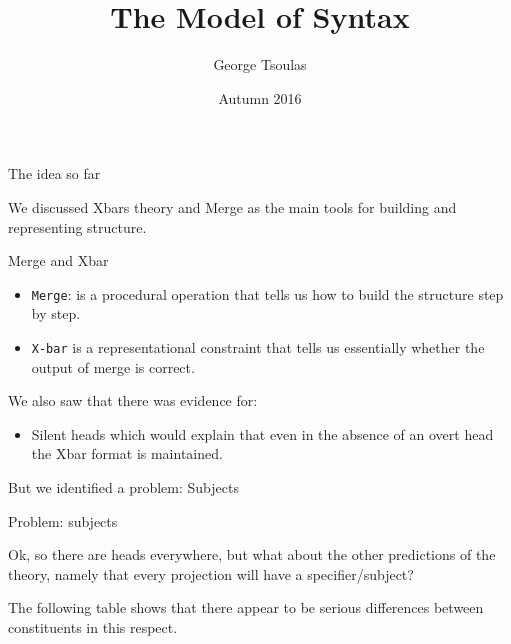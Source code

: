 


\title{The Model of Syntax  }
\date{Autumn 2016}
\author{George Tsoulas}



\maketitle
\begin{frame}
  {The idea so far}

We discussed Xbars theory and Merge as the main tools for building and representing structure.

\end{frame}



\begin{frame}
  {Merge and Xbar}

  \begin{itemize}
\item    \texttt{Merge}:  is a procedural operation that tells us how to build the structure step by step.
  \item \texttt{X-bar} is a representational constraint that tells us essentially whether the output of merge is correct.
  \end{itemize}

\end{frame}


\begin{frame}

  We also saw that there was evidence for:

  \begin{itemize}
  \item Silent heads which would explain that even in the absence of an overt head the Xbar format is maintained.
  \end{itemize}

But we identified a problem:  Subjects

\end{frame}




\begin{frame}
  {Problem:  subjects}

Ok, so there are heads everywhere, but what about the other predictions of the theory, namely that every projection will have a specifier/subject?  

The following table shows that there appear to be serious differences between constituents in this respect.
\end{frame}

